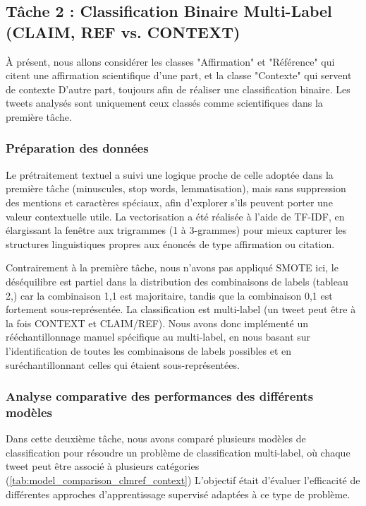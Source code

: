 \subsection{Tâche 2 : Classification Binaire Multi-Label ({CLAIM, REF} vs. {CONTEXT})}\label{subsec:modele-2:-claim-et-ref-vs-contexte}
À présent, nous allons considérer les classes "Affirmation" et "Référence" qui citent une affirmation scientifique d’une part, et la classe "Contexte" qui servent de contexte
D’autre part, toujours afin de réaliser une classification binaire.
Les tweets analysés sont uniquement ceux classés comme scientifiques dans la première tâche.

\subsubsection{Préparation des données}
Le prétraitement textuel a suivi une logique proche de celle adoptée dans la première tâche (minuscules, stop words, lemmatisation), mais sans suppression des mentions et caractères spéciaux, afin d’explorer s’ils peuvent porter une valeur contextuelle utile.
La vectorisation a été réalisée à l’aide de TF-IDF, en élargissant la fenêtre aux trigrammes (1 à 3-grammes) pour mieux capturer les structures linguistiques propres aux énoncés de type affirmation ou citation.

Contrairement à la première tâche, nous n’avons pas appliqué SMOTE ici, le déséquilibre est partiel dans la distribution des combinaisons de labels (tableau 2,) car la combinaison {1,1} est majoritaire, tandis que la combinaison {0,1} est fortement sous-représentée.
La classification est multi-label (un tweet peut être à la fois CONTEXT et CLAIM/REF).
Nous avons donc implémenté un rééchantillonnage manuel spécifique au multi-label, en nous basant sur l’identification de toutes les combinaisons de labels possibles et en suréchantillonnant celles qui étaient sous-représentées.

\subsubsection{Analyse comparative des performances des différents modèles}
Dans cette deuxième tâche, nous avons comparé plusieurs modèles de classification pour résoudre un problème de classification multi-label, où chaque tweet peut être associé à plusieurs catégories (\autoref{tab:model_comparison_clmref_context})
L’objectif était d’évaluer l’efficacité de différentes approches d’apprentissage supervisé adaptées à ce type de problème.

